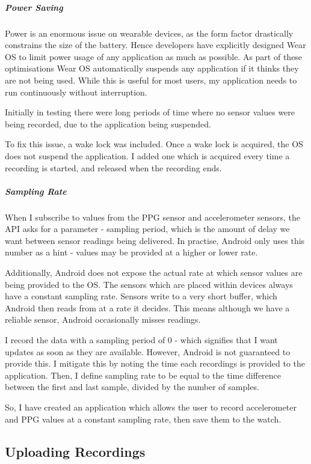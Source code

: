 \documentclass[12pt,a4paper,twoside,openright]{report}
\begin{document}
\subparagraph{Power Saving}

Power is an enormous issue on wearable devices, as the form factor drastically
constrains the size of the battery. Hence developers have explicitly designed
Wear OS to limit power usage of any application as much as possible. 
As part of these optimisations Wear OS automatically suspends any application
if it thinks they are not being used. While this is useful for most users, my
application needs to run continuously without interruption.

Initially in testing there were long periods of time where no sensor values
were being recorded, due to the application being suspended.

To fix this issue, a wake lock was included. Once a wake lock is acquired, the
OS does not suspend the application. I added one which is acquired every time
a recording is started, and released when the recording ends.

\subparagraph{Sampling Rate}

When I subscribe to values from the PPG sensor and accelerometer sensors, the
API asks for a parameter - sampling period, which is the amount of delay we
want between sensor readings being delivered. In practise, Android only uses
this number as a hint - values may be provided at a higher or lower rate.

Additionally, Android does not expose the actual rate at which sensor values
are being provided to the OS. The sensors which are placed within devices
always have a constant sampling rate. Sensors write to a very short buffer,
which Android then reads from at a rate it decides. This means although we
have a reliable sensor, Android occasionally misses readings.

I record the data with a sampling period of 0 - which signifies that I want
updates as soon as they are available. However, Android is not guaranteed to
provide this. I mitigate this by noting the time each recordings is provided to the
application. Then, I define sampling rate to be equal to the time difference
between the first and last sample, divided by the number of samples.

So, I have created an application which allows the user to record
accelerometer and PPG values at a constant sampling rate, then save them to
the watch.

\subsection{Uploading Recordings}
\end{document}
